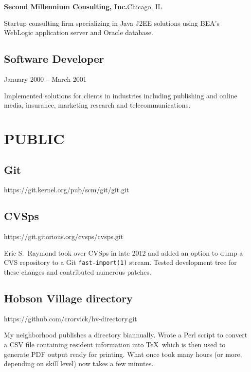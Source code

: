 {\vskip 20pt

{\bf Second Millennium Consulting, Inc.}\quad Chicago, IL

Startup consulting firm specializing in Java J2EE solutions using BEA's
WebLogic application server and Oracle database.

\vskip 5pt
\subsection{Software Developer}
    {January 2000 -- March 2001}

Implemented solutions for clients in industries including publishing and
online media, insurance, marketing research and telecommunications.

}

\section{PUBLIC}{%
\parskip=3pt
\subsection{Git}        {\tb https://git.kernel.org/pub/scm/git/git.git}




\vskip 8pt

\subsection{CVSps}       {\tb https://git.gitorious.org/cvsps/cvsps.git}

Eric S.\ Raymond took over CVSps in late 2012 and added an option to
dump a CVS repository to a Git {\tt fast-import(1)} stream.  Tested
development tree for these changes and contributed numerous patches.

\vskip 8pt

\subsection{Hobson Village directory}
                      {\tb https://github.com/crorvick/hv-directory.git}

My neighborhood publishes a directory biannually.  Wrote a Perl script
to convert a CSV file containing resident information into \TeX\ which
is then used to generate PDF output ready for printing.  What once took
many hours (or more, depending on skill level) now takes a few minutes.
}

